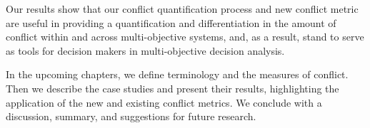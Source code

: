 Our results show that our conflict quantification process and new conflict metric are useful in providing a quantification and differentiation in the amount of conflict within and across multi-objective systems, and, as a result, stand to serve as tools for decision makers in multi-objective decision analysis.

In the upcoming chapters, we define terminology and the measures of conflict. Then we describe the case studies and present their results, highlighting the application of the new and existing conflict metrics. We conclude with a discussion, summary, and suggestions for future research.